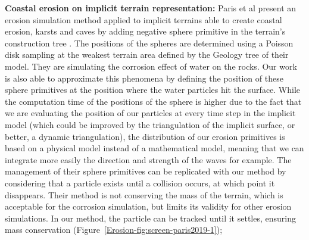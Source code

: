 \textbf{Coastal erosion on implicit terrain representation:}
Paris et al present an erosion simulation method applied to implicit terrains able to create coastal erosion, karsts and caves by adding negative sphere primitive in the terrain's construction tree \cite{Paris2019}. The positions of the spheres are determined using a Poisson disk sampling at the weakest terrain area defined by the Geology tree of their model. They are simulating the corrosion effect of water on the rocks. Our work is also able to approximate this phenomena by defining the position of these sphere primitives at the position where the water particles hit the surface. While the computation time of the positions of the sphere is higher due to the fact that we are evaluating the position of our particles at every time step in the implicit model (which could be improved by the triangulation of the implicit surface, or better, a dynamic triangulation), the distribution of our erosion primitives is based on a physical model instead of a mathematical model, meaning that we can integrate more easily the direction and strength of the waves for example. The management of their sphere primitives can be replicated with our method by considering that a particle exists until a collision occurs, at which point it disappears. Their method is not conserving the mass of the terrain, which is acceptable for the corrosion simulation, but limits its validity for other erosion simulations. In our method, the particle can be tracked until it settles, ensuring mass conservation (Figure~\ref{Erosion-fig:screen-paris2019-1});

